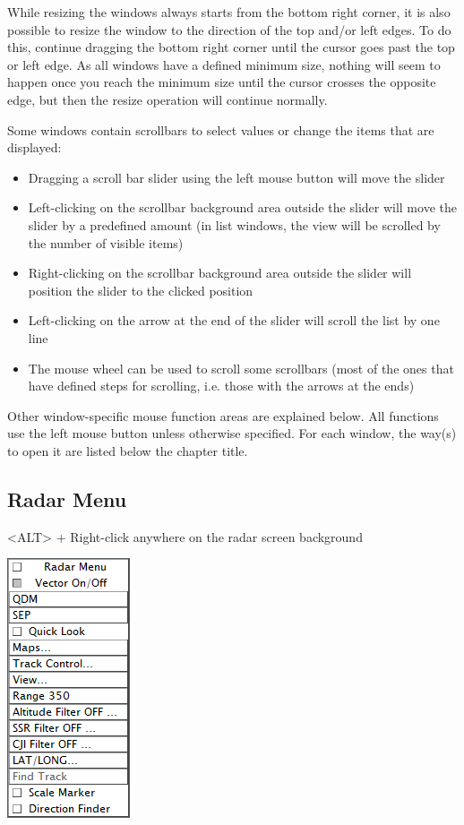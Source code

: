 \documentclass[11pt,a4paper,oldfontcommands]{memoir}
\begin{document}
While resizing the windows always starts from the bottom right corner, it is also possible to resize the window to the direction of the top and/or left edges. To do this, continue dragging the bottom right corner until the cursor goes past the top or left edge. As all windows have a defined minimum size, nothing will seem to happen once you reach the minimum size until the cursor crosses the opposite edge, but then the resize operation will continue normally.

Some windows contain scrollbars to select values or change the items that are displayed:

\begin{itemize}
    \item Dragging a scroll bar slider using the left mouse button will move the slider
    \item Left-clicking on the scrollbar background area outside the slider will move the slider by a predefined amount (in list windows, the view will be scrolled by the number of visible items)
    \item Right-clicking on the scrollbar background area outside the slider will position the slider to the clicked position
    \item Left-clicking on the arrow at the end of the slider will scroll the list by one line
    \item The mouse wheel can be used to scroll some scrollbars (most of the ones that have defined steps for scrolling, i.e. those with the arrows at the ends)
\end{itemize}

Other window-specific mouse function areas are explained below. All functions use the left mouse button unless otherwise specified. For each window, the way(s) to open it are listed below the chapter title.

\subsection{Radar Menu}
\label{menu:radarm}
<ALT> + Right-click anywhere on the radar screen background

\includegraphics{img/radarmenu.png}
\end{document}
